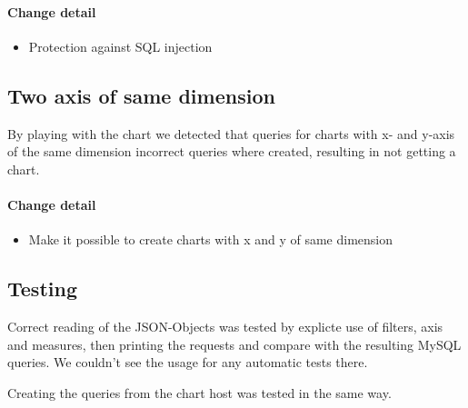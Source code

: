 \paragraph{Change detail}
\begin{itemize}
  \item Protection against SQL injection
\end{itemize}


\subsection{Two axis of same dimension}
By playing with the chart we detected that queries for
charts with x- and y-axis of the same dimension incorrect
queries where created, resulting in not getting a chart.
\paragraph{Change detail}
\begin{itemize}
  \item Make it possible to create charts with x and y of same dimension
\end{itemize}



\subsection{Testing}

Correct reading of the JSON-Objects was tested by explicte use of filters, axis and measures, 
then printing the requests and compare with the resulting MySQL queries. We couldn't see
the usage for any automatic tests there.

Creating the queries from the chart host was tested in the same way. 

